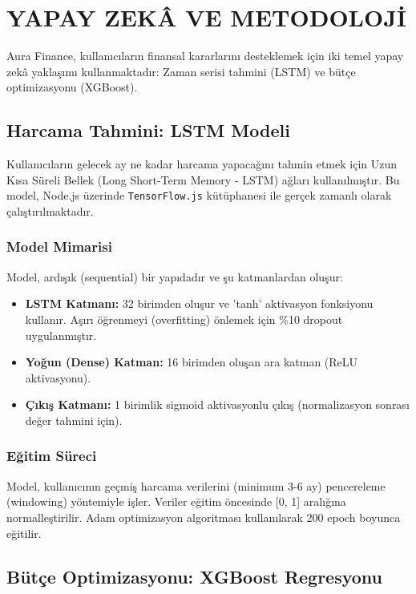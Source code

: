 \chapter{YAPAY ZEKÂ VE METODOLOJİ}\label{ch:ai_metodoloji}
\vspace*{-1cm}

Aura Finance, kullanıcıların finansal kararlarını desteklemek için iki temel yapay zekâ yaklaşımı kullanmaktadır: Zaman serisi tahmini (LSTM) ve bütçe optimizasyonu (XGBoost).

\section{Harcama Tahmini: LSTM Modeli}

Kullanıcıların gelecek ay ne kadar harcama yapacağını tahmin etmek için Uzun Kısa Süreli Bellek (Long Short-Term Memory - LSTM) ağları kullanılmıştır. Bu model, Node.js üzerinde \texttt{TensorFlow.js} kütüphanesi ile gerçek zamanlı olarak çalıştırılmaktadır.

\subsection{Model Mimarisi}
Model, ardışık (sequential) bir yapıdadır ve şu katmanlardan oluşur:
\begin{itemize}
    \item \textbf{LSTM Katmanı:} 32 birimden oluşur ve 'tanh' aktivasyon fonksiyonu kullanır. Aşırı öğrenmeyi (overfitting) önlemek için \%10 dropout uygulanmıştır.
    \item \textbf{Yoğun (Dense) Katman:} 16 birimden oluşan ara katman (ReLU aktivasyonu).
    \item \textbf{Çıkış Katmanı:} 1 birimlik sigmoid aktivasyonlu çıkış (normalizasyon sonrası değer tahmini için).
\end{itemize}

\subsection{Eğitim Süreci}
Model, kullanıcının geçmiş harcama verilerini (minimum 3-6 ay) pencereleme (windowing) yöntemiyle işler. Veriler eğitim öncesinde [0, 1] aralığına normalleştirilir. Adam optimizasyon algoritması kullanılarak 200 epoch boyunca eğitilir.

\section{Bütçe Optimizasyonu: XGBoost Regresyonu}

